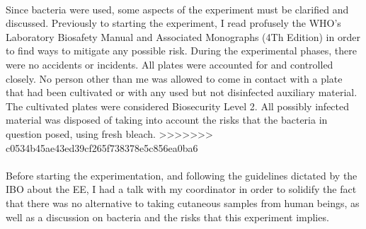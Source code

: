 \paragraph{}Since bacteria were used, some aspects of the experiment must be clarified and discussed. Previously to starting the experiment, I read profusely the WHO's Laboratory Biosafety Manual and Associated Monographs (4Th Edition)\cite{worldhealthorganizationLaboratoryBiosafetyManual2020} in order to find ways to mitigate any possible risk. During the experimental phases, there were no accidents or incidents. All plates were accounted for and controlled closely. No person other than me was allowed to come in contact with a plate that had been cultivated or with any used but not disinfected auxiliary material. The cultivated plates were considered Biosecurity Level 2. All possibly infected material was disposed of taking into account the risks that the bacteria in question posed, using fresh bleach.
>>>>>>> c0534b45ae43ed39cf265f738378e5c856ea0ba6
\paragraph{}Before starting the experimentation, and following the guidelines dictated by the IBO about the EE, I had a talk with my coordinator in order to solidify the fact that there was no alternative to taking cutaneous samples from human beings, as well as a discussion on bacteria and the risks that this experiment implies.
